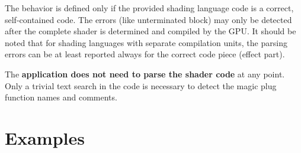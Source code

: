 \documentclass{egpubl}
\begin{document}
The behavior is defined only if the provided shading language code
is a correct, self-contained code. The errors (like unterminated block)
may only be detected after the complete shader
is determined and compiled by the GPU.
It should be noted that for shading languages with separate compilation units,
the parsing errors can be at least reported always for the correct code piece
(effect part).

The \textbf{application does not need to parse the shader code} at any point.
Only a trivial text search in the code is necessary to detect the magic
plug function names and comments.




\section{Examples}
\end{document}
